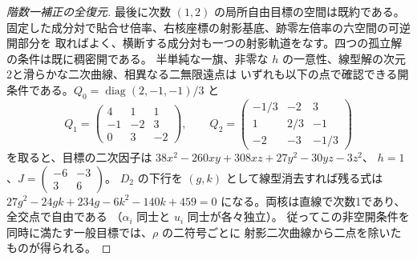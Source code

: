 \begin{proof}[階数一補正の全復元]
最後に次数 $(1,2)$ の局所自由目標の空間は既約である。
固定した成分対で貼合せ倍率、右核座標の射影基底、跡零左倍率の六空間の可逆開部分を
取ればよく、横断する成分対も一つの射影軌道をなす。四つの孤立解の条件は既に稠密開である。
半単純な一旗、非零な $h$ の一意性、線型解の次元2と滑らかな二次曲線、相異なる二無限遠点は
いずれも以下の点で確認できる開条件である。$Q_0=\operatorname{diag}(2,-1,-1)/3$ と
\[
 Q_1=\begin{pmatrix}4&1&1\\-1&-2&3\\0&3&-2\end{pmatrix},\qquad
 Q_2=\begin{pmatrix}-1/3&-2&3\\1&2/3&-1\\-2&-3&-1/3\end{pmatrix}
\]
を取ると、目標の二次因子は $38x^2-260xy+308xz+27y^2-30yz-3z^2$、
$h=1$、$J=\left(\begin{smallmatrix}-6&-3\\3&6\end{smallmatrix}\right)$。
$D_2$ の下行を $(g,k)$ として線型消去すれば残る式は
$27g^2-24gk+234g-6k^2-140k+459=0$ になる。両核は直線で次数1であり、全交点で自由である
（$\alpha_i$ 同士と $u_i$ 同士が各々独立）。
従ってこの非空開条件を同時に満たす一般目標では、$\rho$ の二符号ごとに
射影二次曲線から二点を除いたものが得られる。
\end{proof}
